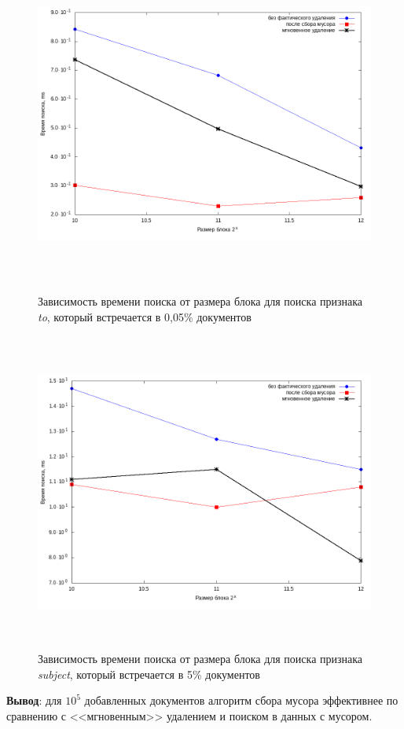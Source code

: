 \begin{figure}[H]
\includegraphics[width=\linewidth, height=10.5cm]{fig/limit_1e6/1e5/to.png}
\caption{Зависимость времени поиска от размера блока для поиска признака \textit{to}, который встречается в 0,05\% документов}
\includegraphics[width=\linewidth, height=10.5cm]{fig/limit_1e6/1e5/subject.png}
\caption{Зависимость времени поиска от размера блока для поиска признака \textit{subject}, который встречается в 5\% документов}
\end{figure}

\textbf{Вывод}: для $10^5$ добавленных документов алгоритм сбора мусора эффективнее
по сравнению с <<мгновенным>> удалением и поиском в данных с мусором.

